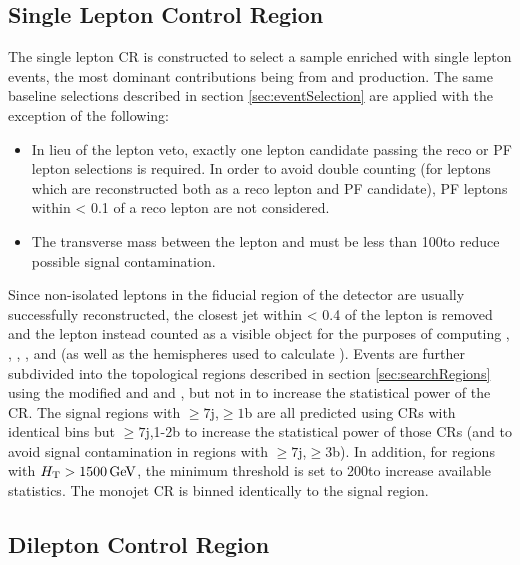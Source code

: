 \subsection{Single Lepton Control Region}
\label{subsec:leptonCR}
The single lepton CR is constructed to select a sample enriched with single lepton events, the most dominant contributions being from \ttbar and \wjets production. The same baseline selections described in section \ref{sec:eventSelection} are applied with the exception of the following:
\begin{itemize}
	\item In lieu of the lepton veto, exactly one lepton candidate passing the reco or PF lepton selections is required. In order to avoid double counting (for leptons which are reconstructed both as a reco lepton and PF candidate), PF leptons within \DR < 0.1 of a reco lepton are not considered. 
	\item The transverse mass \MT between the lepton and \MET must be less than 100\GeV to reduce possible signal contamination.
\end{itemize}
Since non-isolated leptons in the fiducial region of the detector are usually successfully reconstructed, the closest jet within \DR < 0.4 of the lepton is removed and the lepton instead counted as a visible object for the purposes of computing \Ht, \Htmiss, \dphilong, \htovermet, and \mttwo (as well as the hemispheres used to calculate \mttwo). Events are further subdivided into the topological regions described in section \ref{sec:searchRegions} using the modified \HT and \nj and \nb, but not in \mttwo to increase the statistical power of the CR. The signal regions with $\geq7$j,$\geq1$b are all predicted using CRs with identical \Ht bins but $\geq7$j,1-2b to increase the statistical power of those CRs (and to avoid signal contamination in regions with $\geq7$j,$\geq3$b). In addition, for regions with $H_{\mathrm{T}} > 1500\,\text{Ge\hspace{-.08em}V}$, the minimum \mttwo threshold is set to 200\GeV to increase available statistics. The monojet CR is binned identically to the signal region.

\subsection{Dilepton Control Region}
\label{subsec:zllCR}

